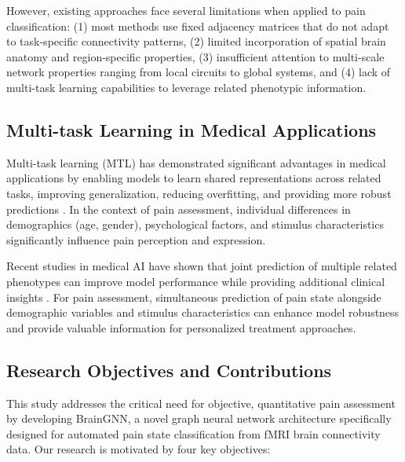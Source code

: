 \documentclass[10pt,journal,compsoc]{IEEEtran}
\begin{document}
However, existing approaches face several limitations when applied to pain classification: (1) most methods use fixed adjacency matrices that do not adapt to task-specific connectivity patterns, (2) limited incorporation of spatial brain anatomy and region-specific properties, (3) insufficient attention to multi-scale network properties ranging from local circuits to global systems, and (4) lack of multi-task learning capabilities to leverage related phenotypic information.

\subsection{Multi-task Learning in Medical Applications}

Multi-task learning (MTL) has demonstrated significant advantages in medical applications by enabling models to learn shared representations across related tasks, improving generalization, reducing overfitting, and providing more robust predictions \cite{caruana1997multitask,ruder2017overview}. In the context of pain assessment, individual differences in demographics (age, gender), psychological factors, and stimulus characteristics significantly influence pain perception and expression.

Recent studies in medical AI have shown that joint prediction of multiple related phenotypes can improve model performance while providing additional clinical insights \cite{topol2019high}. For pain assessment, simultaneous prediction of pain state alongside demographic variables and stimulus characteristics can enhance model robustness and provide valuable information for personalized treatment approaches.

\subsection{Research Objectives and Contributions}

This study addresses the critical need for objective, quantitative pain assessment by developing BrainGNN, a novel graph neural network architecture specifically designed for automated pain state classification from fMRI brain connectivity data. Our research is motivated by four key objectives:
\end{document}
